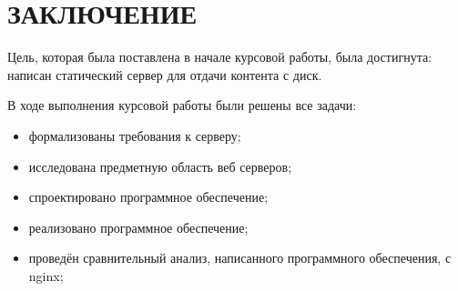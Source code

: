 \chapter*{ЗАКЛЮЧЕНИЕ}

Цель, которая была поставлена в начале курсовой работы, была достигнута:  написан статический сервер для отдачи контента с диск.

В ходе выполнения курсовой работы были решены все задачи:
\begin{itemize}[label=---]
	\item формализованы требования к серверу;
	\item исследована предметную область веб серверов;
	\item спроектировано программное обеспечение;
	\item реализовано программное обеспечение;
	\item проведён сравнительный анализ, написанного программного обеспечения, с nginx;
\end{itemize}


